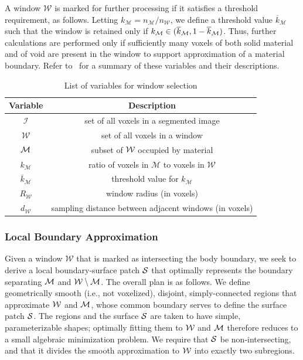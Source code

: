 A window $\mathcal{W}$ is marked for further processing if it satisfies a threshold requirement, as follows.  Letting $k_{\mathcal{M}} = n_{\mathcal{M}}/n_{\mathcal{W}}$, we define a threshold value $\overline{k}_{\mathcal{M}}$ such that the window is retained only if $k_{\mathcal{M}} \in (\overline{k}_{\mathcal{M}}, 1 - \overline{k}_{\mathcal{M}})$.  Thus, further calculations are performed only if sufficiently many voxels of both solid material and of void are present in the window to support approximation of a material boundary. Refer to~ for a summary of these variables and their descriptions. 

\begin{table}[htbp!]
 \centering
   \begin{tabular}{|c||c|}
   \hline
   {\textbf{Variable}} & \textbf{Description} \\ \hline \hline
   $\mathcal{I}$ & set of all voxels in a segmented image \\ \hline
   $\mathcal{W}$ & set of all voxels in a window \\ \hline
   $\mathcal{M}$ & subset of $\mathcal{W}$ occupied by material  \\ \hline
   {$k_{\mathcal{M}}$} & ratio of voxels in $\mathcal{M}$ to voxels in $\mathcal{W}$\\ \hline
   {$\overline{k}_{\mathcal{M}}$ \rule{0mm}{4mm}} & threshold value for $k_{\mathcal{M}}$ \\ \hline 
   $R_{\mathcal{W}}$ & window radius (in voxels) \\ \hline
   $d_{\mathcal{W}}$ & sampling distance between adjacent windows (in voxels) \\ \hline  
\end{tabular}
\caption{List of variables for window selection}
\label{tab:window}
\end{table}

\subsubsection{Local Boundary Approximation}

Given a window $\mathcal{W}$ that is marked as intersecting the body boundary, we seek to derive a local boundary-surface patch $\mathcal{S}$ that optimally represents the boundary separating $\mathcal{M}$ and $\mathcal{W} \setminus \mathcal{M}$.  The overall plan is as follows.  We define geometrically smooth (i.e., not voxelized), disjoint, simply-connected regions that approximate $\mathcal{W}$ and $\mathcal{M}$, whose common boundary serves to define the surface patch $\mathcal{S}$.  The regions and the surface $\mathcal{S}$ are taken to have simple, parameterizable shapes; optimally fitting them to $\mathcal{W}$ and $\mathcal{M}$ therefore reduces to a small algebraic minimization problem.  We require that $\mathcal{S}$ be non-intersecting, and that it divides the smooth approximation to $\mathcal{W}$ into exactly two subregions.

